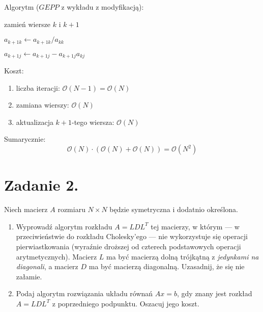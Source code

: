 \documentclass[a4paper]{article}
\begin{document}
        Algorytm ($GEPP$ z wykładu z modyfikacją):

            \begin{algorithm}
                \begin{algorithmic}[1]
                            zamień wiersze $k$ i $k+1$
                        \EndIf

                        \State $a_{k+1k} \gets a_{k+1k} / a_{kk}$

                            \State $a_{k+1j} \gets a_{k+1j} - a_{k+1j}a_{kj}$
                        \EndFor
                    \EndFor
                \end{algorithmic}\label{alg:algorithm}
            \end{algorithm}

        Koszt:
        \begin{enumerate}
            \item
                liczba iteracji: $\mathcal{O}(N-1) = \mathcal{O}(N)$

            \item
                zamiana wierszy: $\mathcal{O}(N)$

            \item
                aktualizacja $k+1$-tego wiersza: $\mathcal{O}(N)$

        \end{enumerate}

        Sumarycznie:
        \[\mathcal{O}(N) \cdot (\mathcal{O}(N) + \mathcal{O}(N)) = \mathcal{O}(N^2)\]


    \section*{Zadanie 2.}

        Niech macierz $A$ rozmiaru $N \times N$ będzie symetryczna i dodatnio określona. \\

        \begin{enumerate}[label=(\alph*)]
            \item
                Wyprowadź algorytm rozkładu $A = LDL^{T}$ tej macierzy,
                w którym — w przeciwieństwie do rozkładu Cholesky’ego —
                nie wykorzystuje się operacji pierwiastkowania
                (wyraźnie droższej od czterech podstawowych operacji arytmetycznych).
                Macierz $L$ ma być macierzą dolną trójkątną z \textit{jedynkami na diagonali},
                a macierz $D$ ma być macierzą diagonalną.
                Uzasadnij, że się nie załamie.

            \item
                Podaj algorytm rozwiązania układu równań $Ax = b$,
                gdy znany jest rozkład $A = LDL^{T}$ z poprzedniego podpunktu.
                Oszacuj jego koszt.

        \end{enumerate}
\end{document}
